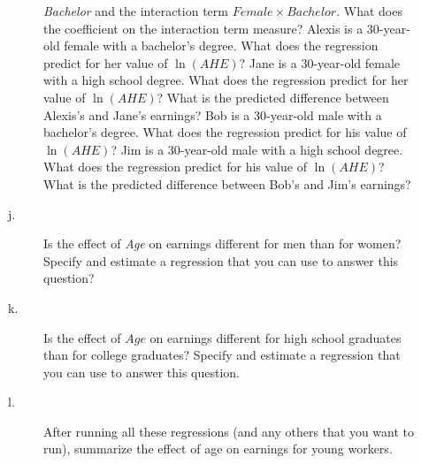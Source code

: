 \documentclass[a4paper,11pt]{article}
\begin{document}
\begin{description}
\begin{description}
\emph{Bachelor} and the interaction term \(Female \times
          Bachelor\). What does the coefficient on the interaction term
measure? Alexis is a 30-year-old female with a bachelor's
degree. What does the regression predict for her value of
\(\ln(AHE)\)? Jane is a 30-year-old female with a high school
degree. What does the regression predict for her value of
\(\ln(AHE)\)? What is the predicted difference between
Alexis's and Jane's earnings? Bob is a 30-year-old male with
a bachelor's degree. What does the regression predict for
his value of \(\ln(AHE)\)? Jim is a 30-year-old male with a
high school degree. What does the regression predict for his
value of \(\ln(AHE)\)? What is the predicted difference
between Bob's and Jim's earnings?
\item[{j.}] Is the effect of \emph{Age} on earnings different for men than
for women? Specify and estimate a regression that you can
use to answer this question?
\item[{k.}] Is the effect of \(Age\) on earnings different for high school
graduates than for college graduates? Specify and estimate a
regression that you can use to answer this question.
\item[{l.}] After running all these regressions (and any others that you
want to run), summarize the effect of age on earnings for
young workers.
\end{description}
\end{description}
\end{document}
